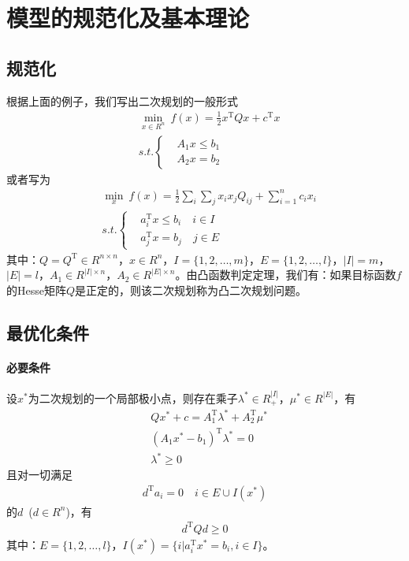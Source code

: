 \section{模型的规范化及基本理论}
    \subsection{规范化}
        \par
        根据上面的例子，我们写出二次规划的一般形式
        \begin{align*}
        &\mathop {\min}\limits_{x\in R^n}\ f(x)=\frac 12 x^\mathrm{T} Qx+c^\mathrm{T} x\\
        &s.t.\left\{
        \begin{aligned}
        &A_1x \leqslant b_1\\
        &A_2x = b_2
        \end{aligned}
        \right.
        \end{align*}
        或者写为
        \begin{align*}
        &\mathop {\min}\limits_{x}\ f(x)=\frac 12 \mathop{\sum}\limits_{i}\mathop{\sum}\limits_{j}x_ix_j{Q}_{ij}+\mathop {\sum}\limits_{i=1}^n c_ix_i\\
        &s.t.\left\{
        \begin{aligned}
        &a_i^\mathrm{T} x \leqslant b_i \quad i \in I\\
        & a_j^\mathrm{T} x = b_j \quad j \in E
        \end{aligned}
        \right.
        \end{align*}
        其中：$Q=Q^\mathrm{T}  \in R^{n \times n}$，$x \in R^n$，$I=\{1,2,\ldots,m\}$，$E=\{1,2,\ldots,l\}$，$|I|=m$，$|E|=l$，$A_1 \in R^{|I|\times n}$，$A_2 \in R^{|E|\times n}$。由凸函数判定定理，我们有：如果目标函数$f$的Hesse矩阵$Q$是正定的，则该二次规划称为凸二次规划问题。
    \subsection{最优化条件}
        \paragraph{必要条件}
        设$x^*$为二次规划的一个局部极小点，则存在乘子${\lambda}^* \in R^{|I|}_{+}$，${\mu}^* \in R^{|E|}$，有
        \begin{align*}
        &Qx^*+c=A_1^\mathrm{T} {\lambda}^*+A_2^\mathrm{T} {\mu}^*\\
        &(A_1x^*-b_1)^\mathrm{T} {\lambda}^*=0\\
        &{\lambda}^* \geqslant 0
        \end{align*}
        且对一切满足
        \begin{align*}
        d^\mathrm{T} a_i=0\quad i \in E \cup I(x^*)
        \end{align*}
        的$d$\ ($d\in R^n$)，有
        \begin{align*}
        d^\mathrm{T} Qd \geqslant 0
        \end{align*}
        其中：$E=\{1,2,\ldots,l\}$，$I(x^*)=\{i|a_i^\mathrm{T} x^*=b_i,i \in I\}$。
